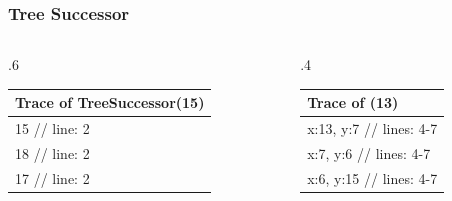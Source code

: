 \documentclass[10pt]{beamer}
\begin{document}
\begin{frame}[t]\frametitle{Tree Successor}
	\begin{columns}[T] %
	\begin{column}{.6\linewidth} %
		{\footnotesize
				
		} %

		{\footnotesize 
			\begin{tabular}{| l |}
			\hline
			Trace of {\scriptsize TreeSuccessor(15)}\\
			\hline
			15 // line: 2\\
			18 // line: 2\\
			17 // line: 2\\
			\hline
			\end{tabular}
		} %

	\end{column} %
	\begin{column}{.4\linewidth} %

		{\small 
		
		} %
	

		{\footnotesize 
			\begin{tabular}{| l |}
			\hline
			Trace of {\scriptsize \TreeSuccessor(13)}\\
			\hline
			x:13, y:7 // lines: 4-7\\
			x:7, y:6 // lines: 4-7\\
			x:6, y:15 // lines: 4-7\\
			\hline
			\end{tabular}
		} %

	\end{column} %
	\end{columns} %
	
\end{frame}




\end{document}
